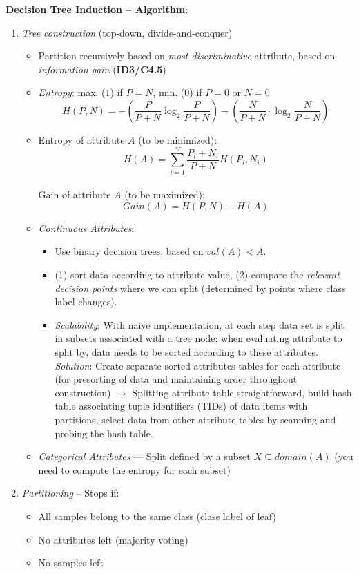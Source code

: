     \textbf{Decision Tree Induction -- Algorithm}:
    \begin{enumerate}
      \item \emph{Tree construction} (top-down, divide-and-conquer)
      \begin{itemize}
        \item Partition recursively based on \emph{most discriminative} attribute, based on \emph{information gain} (\textbf{ID3/C4.5})
        \item \emph{Entropy}: max. ($1$) if $P=N$, min. ($0$) if $P=0$ or $N=0$
        $$H(P,N)=-(\frac{P}{P+N}\log_2{\frac{P}{P+N}})-(\frac{N}{P+N}\cdot\log_2{\frac{N}{P+N}})$$
        \item Entropy of attribute $A$ (to be minimized):
        $$H(A)=\sum_{i=1}^V\frac{P_i+N_i}{P+N}H(P_i,N_i)$$\\
        Gain of attribute $A$ (to be maximized):
        $$Gain(A)=H(P,N)-H(A)$$
        \item \emph{Continuous Attributes}:
        \begin{itemize}
          \item Use binary decision trees, based on $val(A)<A$.
          \item (1) sort data according to attribute value, (2) compare the \emph{relevant decision points} where we can split (determined by points where class label changes).
          \item \emph{Scalability}: With naive implementation, at each step data set is split in subsets associated with a tree node; when evaluating attribute to split by, data needs to be sorted according to these attributes. \emph{Solution}: Create separate sorted attributes tables for each attribute (for presorting of data and maintaining order throughout construction) $\rightarrow$ Splitting attribute table straightforward, build hash table associating tuple identifiers (TIDs) of data items with partitions, select data from other attribute tables by scanning and probing the hash table.
        \end{itemize}
        \item \emph{Categorical Attributes} --- Split defined by a subset $X\subseteq domain(A)$ (you need to compute the entropy for each subset)
      \end{itemize}
      \item \emph{Partitioning} -- Stops if:
      \begin{itemize}
        \item All samples belong to the same class (class label of leaf)
        \item No attributes left (majority voting)
        \item No samples left
      \end{itemize}
    \end{enumerate}

